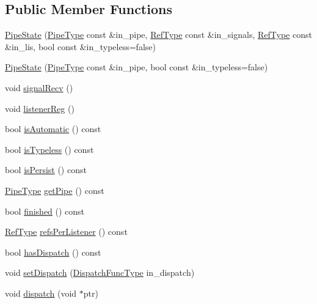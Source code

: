 \subsection*{Public Member Functions}
\begin{DoxyCompactItemize}
\item 
\hyperlink{structvt_1_1pipe_1_1_pipe_state_abbddca53ca44e4417c347235968c7ad9}{Pipe\+State} (\hyperlink{namespacevt_ac9852acda74d1896f48f406cd72c7bd3}{Pipe\+Type} const \&in\+\_\+pipe, \hyperlink{namespacevt_a9b39ce9494bb04674d0d5b895a5aa50f}{Ref\+Type} const \&in\+\_\+signals, \hyperlink{namespacevt_a9b39ce9494bb04674d0d5b895a5aa50f}{Ref\+Type} const \&in\+\_\+lis, bool const \&in\+\_\+typeless=false)
\item 
\hyperlink{structvt_1_1pipe_1_1_pipe_state_a2f6a2a7f657b0938d0214fc16b65969c}{Pipe\+State} (\hyperlink{namespacevt_ac9852acda74d1896f48f406cd72c7bd3}{Pipe\+Type} const \&in\+\_\+pipe, bool const \&in\+\_\+typeless=false)
\item 
void \hyperlink{structvt_1_1pipe_1_1_pipe_state_a3cd72e7d91b3752e2cb19bc42b7de397}{signal\+Recv} ()
\item 
void \hyperlink{structvt_1_1pipe_1_1_pipe_state_acfbe1dc3cac73153543a394b4f8add35}{listener\+Reg} ()
\item 
bool \hyperlink{structvt_1_1pipe_1_1_pipe_state_ada2a4221edc09264da146ff158e37d3c}{is\+Automatic} () const
\item 
bool \hyperlink{structvt_1_1pipe_1_1_pipe_state_a0e20b860728e1aded738be02074c5861}{is\+Typeless} () const
\item 
bool \hyperlink{structvt_1_1pipe_1_1_pipe_state_a8922ec696ab8a01651a53011a548b067}{is\+Persist} () const
\item 
\hyperlink{namespacevt_ac9852acda74d1896f48f406cd72c7bd3}{Pipe\+Type} \hyperlink{structvt_1_1pipe_1_1_pipe_state_ab69e2e4c5783a5df48087fdb436a7a2f}{get\+Pipe} () const
\item 
bool \hyperlink{structvt_1_1pipe_1_1_pipe_state_a593b2ce5b04ce3e4234654f454868434}{finished} () const
\item 
\hyperlink{namespacevt_a9b39ce9494bb04674d0d5b895a5aa50f}{Ref\+Type} \hyperlink{structvt_1_1pipe_1_1_pipe_state_a4e0c0ff9eebf70c05e283474fdbdeb14}{refs\+Per\+Listener} () const
\item 
bool \hyperlink{structvt_1_1pipe_1_1_pipe_state_adbd64a53d60cfe18a7c9994cf2af901b}{has\+Dispatch} () const
\item 
void \hyperlink{structvt_1_1pipe_1_1_pipe_state_a436083ce72366f0bece034065bb3aca1}{set\+Dispatch} (\hyperlink{structvt_1_1pipe_1_1_pipe_state_ad81b637847d9c3185420c58c9272ed7d}{Dispatch\+Func\+Type} in\+\_\+dispatch)
\item 
void \hyperlink{structvt_1_1pipe_1_1_pipe_state_a1e2aea22713ea6b745323f6b3f82b6ed}{dispatch} (void $\ast$ptr)
\end{DoxyCompactItemize}

